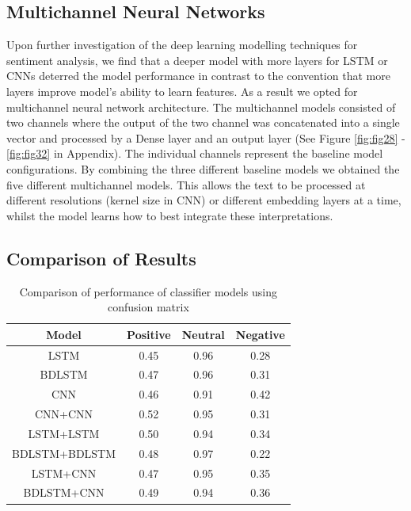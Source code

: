 \documentclass[conference]{IEEEtran}
\begin{document}
\subsection{Multichannel Neural Networks}

Upon further investigation of the deep learning modelling techniques for sentiment analysis, we find that a deeper model with more layers for LSTM or CNNs deterred the model performance in contrast to the convention that more layers improve model's ability to learn features. As a result we opted for multichannel neural network architecture. The multichannel models consisted of two channels where the output of the two channel was concatenated into a single vector and processed by a Dense layer and an output layer (See Figure \ref{fig:fig28} - \ref{fig:fig32} in Appendix). The individual channels represent the baseline model configurations. By combining the three different baseline models we obtained the five different multichannel models. This allows the text to be processed at different resolutions (kernel size in CNN) or different embedding layers at a time, whilst the model learns how to best integrate these interpretations.  


\subsection{Comparison of Results}


\begin{table}[h!]
\centering
\caption{Comparison of performance of classifier models using confusion matrix}

\begin{tabular}{||c c c c||} 
 \hline
 Model & Positive & Neutral & Negative \\ [0.5ex] 
 \hline\hline
  LSTM & 0.45 & 0.96 & 0.28 \\
 BDLSTM & 0.47 & 0.96 & 0.31 \\ 
 CNN & 0.46 & 0.91 & 0.42 \\
 CNN+CNN & 0.52 & 0.95 & 0.31 \\
 LSTM+LSTM & 0.50 & 0.94 & 0.34 \\
 BDLSTM+BDLSTM & 0.48 & 0.97 & 0.22 \\
 LSTM+CNN & 0.47 & 0.95 & 0.35 \\
 BDLSTM+CNN & 0.49 & 0.94 & 0.36\\[1ex] 
 \hline
\end{tabular}

\label{table:2}
\end{table}
\end{document}
